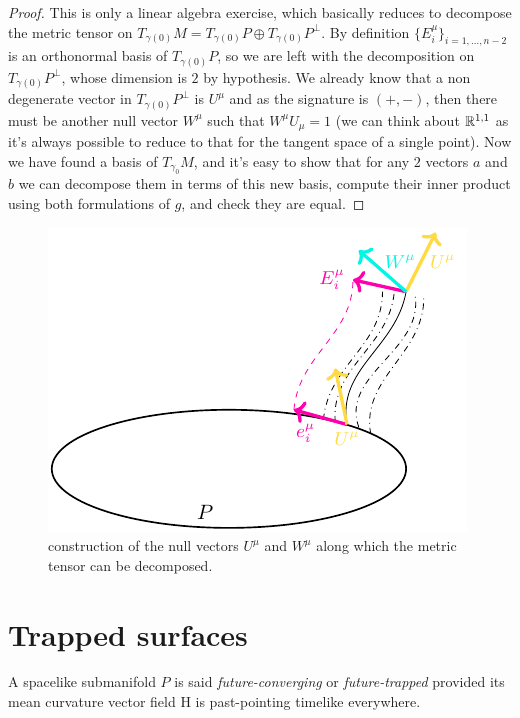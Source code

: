 \begin{proof}
	This is only a linear algebra exercise, which basically reduces to decompose the metric tensor on \(T_{\gamma(0)}M = T_{\gamma(0)}P \oplus T_{\gamma(0)}P^{\perp}\). By definition \(\{E_i^{\mu}\}_{i = 1, \ldots, n - 2}\) is an orthonormal basis of \(T_{\gamma(0)}P\), so we are left with the decomposition on \(T_{\gamma(0)}P^{\perp}\), whose dimension is \(2\) by hypothesis.
	We already know that a non degenerate vector in \(T_{\gamma(0)}P^{\perp}\) is \(U^{\mu}\) and as the signature is \((+, -)\), then there must be another null vector \(W^{\mu}\) such that \(W^{\mu}U_{\mu} = 1\) (we can think about \({\mathbb{R}}^{1,1}\) as it's always possible to reduce to that for the tangent space of a single point). Now we have found a basis of \(T_{\gamma_0}M\), and it's easy to show that for any \(2\) vectors \(a\) and \(b\) we can decompose them in terms of this new basis, compute their inner product using both formulations of \(g\), and check they are equal.
\end{proof}

\begin{figure}
	\caption[]{construction of the null vectors \(U^{\mu}\) and \(W^{\mu}\) along which the metric tensor can be decomposed.}
	\label{fig:metric-decomposition}
	\centering
	\includegraphics[scale=1.5]{Immagini/metric-decomposition/metric-decomposition.pdf}
\end{figure}

\section{Trapped surfaces}

\begin{definition}
	\label{def:trapped-surface}
	A spacelike submanifold \(P\) is said \emph{future-converging} or \emph{future-trapped} provided its mean curvature vector field \(\mathrm{H}\) is past-pointing timelike everywhere.
\end{definition}


